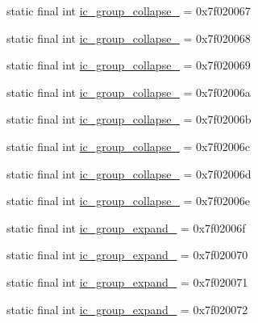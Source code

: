 \begin{CompactItemize}
\item 
static final int \hyperlink{classandroid_1_1support_1_1graphics_1_1drawable_1_1animated_1_1_r_1_1drawable_9a65e51304c7332d80856a5e35661744}{ic\_\-group\_\-collapse\_} = 0x7f020067
\item 
static final int \hyperlink{classandroid_1_1support_1_1graphics_1_1drawable_1_1animated_1_1_r_1_1drawable_9e7fd6e513a2ae449ea6ea2426de5e05}{ic\_\-group\_\-collapse\_} = 0x7f020068
\item 
static final int \hyperlink{classandroid_1_1support_1_1graphics_1_1drawable_1_1animated_1_1_r_1_1drawable_ebb66b1966d243fdb0057b4fbe938f19}{ic\_\-group\_\-collapse\_} = 0x7f020069
\item 
static final int \hyperlink{classandroid_1_1support_1_1graphics_1_1drawable_1_1animated_1_1_r_1_1drawable_a7776023e08db52a3962dd3f309a5349}{ic\_\-group\_\-collapse\_} = 0x7f02006a
\item 
static final int \hyperlink{classandroid_1_1support_1_1graphics_1_1drawable_1_1animated_1_1_r_1_1drawable_19a70c8e78412f42f068bcfacabfb49b}{ic\_\-group\_\-collapse\_} = 0x7f02006b
\item 
static final int \hyperlink{classandroid_1_1support_1_1graphics_1_1drawable_1_1animated_1_1_r_1_1drawable_756d4688d255c5241d7d160b05d1be02}{ic\_\-group\_\-collapse\_} = 0x7f02006c
\item 
static final int \hyperlink{classandroid_1_1support_1_1graphics_1_1drawable_1_1animated_1_1_r_1_1drawable_c5c35a66eb5f493226591e16efc40851}{ic\_\-group\_\-collapse\_} = 0x7f02006d
\item 
static final int \hyperlink{classandroid_1_1support_1_1graphics_1_1drawable_1_1animated_1_1_r_1_1drawable_ee65275723f52d95646efd59034e32fa}{ic\_\-group\_\-collapse\_} = 0x7f02006e
\item 
static final int \hyperlink{classandroid_1_1support_1_1graphics_1_1drawable_1_1animated_1_1_r_1_1drawable_2ae7f044b5734648c6a9d801a7d826d2}{ic\_\-group\_\-expand\_} = 0x7f02006f
\item 
static final int \hyperlink{classandroid_1_1support_1_1graphics_1_1drawable_1_1animated_1_1_r_1_1drawable_aa2f4b3199505166e72132c2d6b2fead}{ic\_\-group\_\-expand\_} = 0x7f020070
\item 
static final int \hyperlink{classandroid_1_1support_1_1graphics_1_1drawable_1_1animated_1_1_r_1_1drawable_2a6cf22fe62a420e2b68823c822adb58}{ic\_\-group\_\-expand\_} = 0x7f020071
\item 
static final int \hyperlink{classandroid_1_1support_1_1graphics_1_1drawable_1_1animated_1_1_r_1_1drawable_8426a7ff320139f1362cf5b72227a530}{ic\_\-group\_\-expand\_} = 0x7f020072

\end{CompactItemize}
